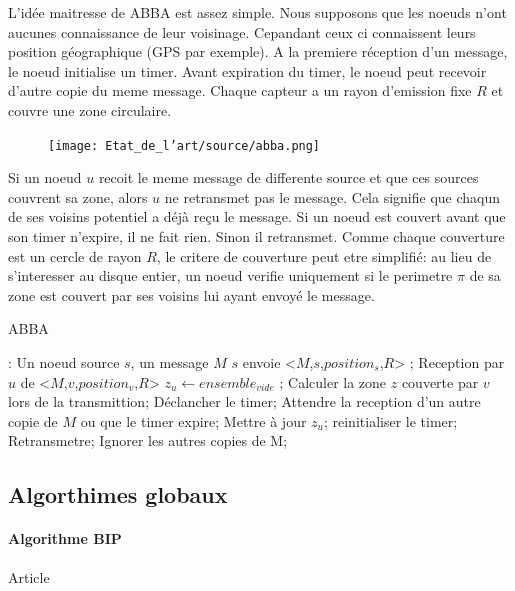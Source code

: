 L'idée maitresse de ABBA est assez simple. Nous supposons que les noeuds n'ont aucunes connaissance de leur voisinage. Cepandant ceux ci connaissent leurs position géographique (GPS par exemple).
A la premiere réception d'un message, le noeud initialise un timer. Avant expiration du timer, le noeud peut recevoir d'autre copie du meme message. Chaque capteur a un rayon d'emission fixe $R$
et couvre une zone circulaire.
\begin{figure}[H]
\centering
\texttt{[image: Etat\_de\_l'art/source/abba.png]}
\caption{ }
\end{figure} 
 Si un noeud $u$ recoit le meme message de differente source et que ces sources couvrent sa zone, alors $u$ ne retransmet pas le message.
Cela signifie que chaqun de ses voisins potentiel a déjà reçu le message. Si un noeud est couvert avant que son timer n'expire, il ne fait rien. Sinon il retransmet.
Comme chaque couverture est un cercle de rayon $R$, le critere de couverture peut etre simplifié: au lieu de s'interesser au disque entier, un noeud verifie uniquement si le perimetre $\pi$ de sa zone est couvert par 
ses voisins lui ayant envoyé le message. 

\begin{algorithm}[h]
\caption{ABBA}
\label{ABBA}
\begin{algorithmic}
\REQUIRE:
Un noeud source $s$, un message $M$
\STATE $s$ envoie  <$M$,$s$,$position_s$,$R$> ;
\STATE Reception  par  $u$ de  <$M$,$v$,$position_v$,$R$>
\STATE $z_u\leftarrow ensemble_{vide}$ ;
\STATE Calculer la zone $z$ couverte par $v$ lors de la transmittion;
\STATE Déclancher le timer;
\REPEAT
    \STATE Attendre la reception d'un autre copie de $M$ ou que le timer expire;
	\STATE Mettre à jour $z_u$;
	\STATE reinitialiser le timer;
    \ENDIF
{}
    \STATE Retransmetre;
\ENDIF
     \STATE Ignorer les autres copies de M;

\end{algorithmic}
\end{algorithm}


\subsection{Algorthimes globaux}
\paragraph{Algorithme BIP}
Article \cite{Wieselthier2000}

